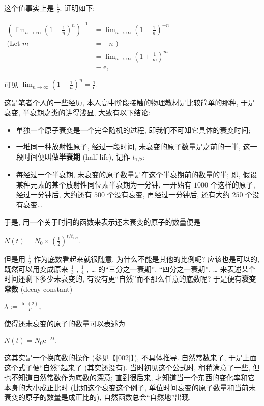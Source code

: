 \begin{tcolorbox}[size=fbox, breakable, enhanced jigsaw, title={抽卡}]
这个值事实上是 $\frac{1}{\mathrm{e}}$. {\kaishu 证明}如下:

$\begin{aligned}\left(\lim_{n\rightarrow\infty}\left (1-\frac{1}{n}\right)^n\right)^{-1}&=\lim_{n\rightarrow\infty}\left (1-\frac{1}{n}\right)^{-n}\\\text{(Let }m&=-n\text{ )}\\&=\lim_{n\rightarrow\infty}\left (1+\frac{1}{m}\right)^m\\&\equiv\mathrm{e,}\end{aligned}$

可见
$\boxed{\lim_{n\rightarrow\infty}\left (1-\frac{1}{n}\right)^n=\frac{1}{\mathrm{e}}}$.

\end{tcolorbox}

\begin{tcolorbox}[size=fbox, breakable, enhanced jigsaw, title={衰变}]

这是笔者个人的一些经历, 本人高中阶段接触的物理教材是比较简单的那种,
于是衰变, 半衰期之类的讲得浅显, 大致有以下结论:

\begin{itemize}

\item
  单独一个原子衰变是一个完全随机的过程, 即我们不可知它具体的衰变时间;
\item 
  一堆同一种放射性原子, 经过一段时间, 未衰变的原子数量是之前的一半,
  这一段时间便叫做\textbf{半衰期} (half-life), 记作 $t_{1/2}$;
\item
  每经过一个半衰期, 未衰变的原子数量是在这个半衰期前的数量的半; 即,
  假设某种元素的某个放射性同位素半衰期为一分钟, 一开始有 $1000$
  个这样的原子, 经过一分钟后, 大约还有 $500$ 个没有衰变,
  再经过一分钟后, 还有大约 $250$ 个没有衰变\ldots{}
\end{itemize}

于是, 用一个关于时间的函数来表示还未衰变的原子的数量便是

$N(t)=N_0\times\left(\frac{1}{2}\right)^{t/t_{1/2}}.$

但是用 $\frac{1}{2}$ 作为底数看起来就很随意, 为什么不能是其他的比例呢?
应该也是可以的, 既然可以用变成原来 $\frac{1}{3}$ , $\frac{1}{4}$ ,
\ldots{} 的``三分之一衰期'', ``四分之一衰期'', \ldots{}
来表述某个时间还剩下多少未衰变的, 有没有更``自然''而不那么任意的底数呢?
于是便有\textbf{衰变常数} (decay constant)

$\lambda:=\frac{\ln(2)}{T},$

使得还未衰变的原子的数量可以表述为

$N(t)=N_0\mathrm{e}^{-\lambda t}.$

这其实是一个换底数的操作 (参见【\ref{002}】), 不具体推导. 自然常数来了,
于是上面这个式子便``自然''起来了 (其实还没有). 当时初见这个公式时,
稍稍满意了一些, 但也不知道自然常数作为底数的深意; 直到很后来,
才知道当一个东西的变化率和它本身的大小成正比时 (比如这个衰变这个例子,
单位时间衰变的原子数量和当前未衰变的原子的数量是成正比的),
自然函数总会``自然地''出现.

\end{tcolorbox}